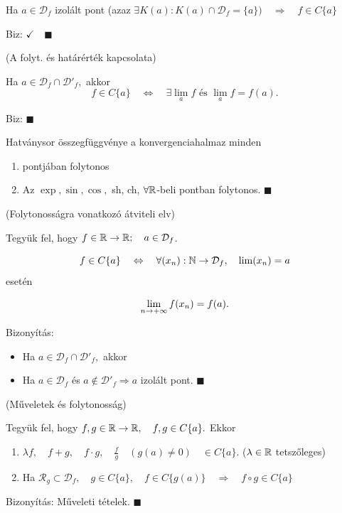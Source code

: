 \documentclass[a4paper,11.5pt]{article}
\begin{document}
		\begin{theorem}
			Ha $a\in\mathcal{D}_f$ izolált pont (azaz $\exists K(a): K(a) \cap\mathcal{D}_f = \{a\}) \quad \Rightarrow \quad f\in C\{a\}$
			
			Biz: $\checkmark \quad \blacksquare$
		\end{theorem} 
		\medskip
		
		\begin{theorem}
			(A folyt. és határérték kapcsolata)
		
		Ha $a\in \mathcal{D}_f\cap\mathcal{D}'_f,$ akkor 
		\[f\in C\{a\} \quad \Leftrightarrow\quad  \exists \lim_af \text{ és }\lim_af=f(a).  \]
		
		Biz: \checkmark\quad $\blacksquare$
		
		\end{theorem}
		
		\begin{theorem}
			Hatványsor összegfüggvénye a konvergenciahalmaz minden
			\begin{enumerate}
				\item pontjában folytonos
				\item Az $\exp, \sin, \cos,$ sh, ch, $\forall \mathbb{R}$-beli pontban folytonos.
				$\blacksquare$
			\end{enumerate}
		
		\end{theorem}
		\begin{theorem}
			(Folytonosságra vonatkozó átviteli elv)
			
			Tegyük fel, hogy $f\in\mathbb{R}\to\mathbb{R};\quad  a\in\mathcal{D}_f$.
			
			\[ f\in C\{a\}\quad \Leftrightarrow\quad  \forall(x_n):  \mathbb{N}\to\mathcal{D}_f,\quad  \lim(x_n) = a \]
			esetén
			
			\[ \displaystyle\lim_{n\to +\infty} f(x_n) = f(a). \]
			
			Bizonyítás: 
			\begin{itemize}
				\item Ha $a\in\mathcal{D}_f\cap\mathcal{D'}_f,$ akkor \checkmark
				\item Ha $a\in\mathcal{D}_f$ és $a\notin \mathcal{D'}_f \Rightarrow a$ izolált pont. $\blacksquare$
			\end{itemize}
			
		\end{theorem}
		\begin{theorem}
			(Műveletek és folytonosság)

			Tegyük fel, hogy $f,g\in\mathbb{R}\to\mathbb{R}, \quad f,g\in C\{a\}.$ Ekkor 
			\begin{enumerate}
				\item $\lambda f,\quad  f+g, \quad f\cdot g,\quad  \frac{f}{g} \quad (g(a)\not=0) \quad \in C\{a\}.$ \quad ($\lambda \in \R\ $tetszőleges)
				\item Ha $\mathcal{R}_g\subset\mathcal{D}_f, \quad g\in C\{a\}, \quad f\in C\{g(a)\}\quad \Rightarrow\quad  f\circ g\in C\{a\}$
			\end{enumerate}
			Bizonyítás: Műveleti tételek. \quad $\blacksquare$
		\end{theorem}
		
\end{document}

